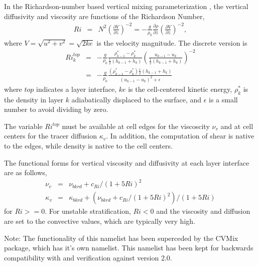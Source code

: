 In the Richardson-number based vertical mixing parameterization \citep{Pacanowski_Philander81jpo}, the vertical diffusivity and viscosity are functions of the Richardson Number,
\begin{eqnarray}   
\label{ocean:\mode_Ri1}
Ri &=& N^2
\left(\frac{\partial V}{\partial z} \right)^{-2}
 = -\frac{g}{\rho_0}\frac{\partial \rho}{\partial z}
\left(\frac{\partial V}{\partial z} \right)^{-2},
\end{eqnarray}
where $V=\sqrt{u^2+v^2}=\sqrt{2ke}$ is the velocity magnitude.  The discrete version is
\begin{eqnarray}   
Ri^{top}_k &=& -\frac{g}{\rho_0}\frac{\rho^*_{k-1}-\rho^*_k}{\frac{1}{2}(h_{k-1}+h_k)}
\left(\frac{u_{k-1}-u_k}{\frac{1}{2}(h_{k-1}+h_k)}\right)^{-2}\\
 &=& -\frac{g}{\rho_0}\frac{(\rho^*_{k-1}-\rho^*_k)\frac{1}{2}(h_{k-1}+h_k)}
{(u_{k-1}-u_k)^2+\epsilon}
\end{eqnarray}
where $top$ indicates a layer interface, $ke$ is the cell-centered kinetic energy, $\rho^*_k$ is the density in layer $k$ adiabatically displaced to the surface, and $\epsilon$ is a small number to avoid dividing by zero.  

The variable $Ri^{top}$ must be available at cell edges for the viscoscity $\nu_v$ and at cell centers for the tracer diffusion $\kappa_v$.  In addition, the computation of shear is native to the edges, while density is native to the cell centers.  

The functional forms for vertical viscosity and diffusivity at each layer interface are as follows,
\begin{eqnarray} \label{ocean:\mode_visc1}  
\nu_v &=& \nu_{bkrd} + c_{Ri}/(1+5Ri)^2\\
\kappa_v &=& \kappa_{bkrd} + (\nu_{bkrd} + c_{Ri}/(1+5Ri)^2)/(1+5Ri)
\end{eqnarray}
for $Ri>=0$.  For unstable stratification, $Ri<0$ and the viscosity and diffusion are set to the convective values, which are typically very high.

Note: The functionality of this namelist has been superceded by the CVMix package, which has it's own namelist.  This namelist has been kept for backwards compatibility with and verification against version 2.0.
